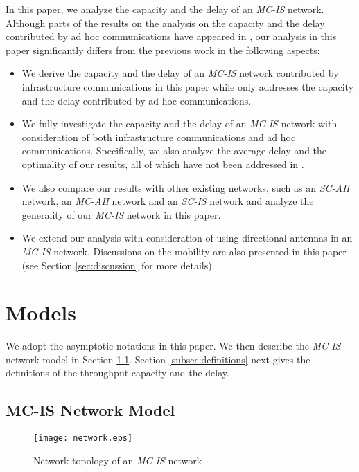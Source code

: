 \documentclass[10pt,journal]{IEEEtran}
\begin{document}
In this paper, we analyze the capacity and the delay of an \textit{MC-IS} network. Although parts of the results on the analysis on the capacity and the delay contributed by ad hoc communications have appeared in \cite{hndai:MC-IS}, our analysis in this paper significantly differs from the previous work in the following aspects:
\begin{itemize}
\item We derive the capacity and the delay of an \textit{MC-IS} network contributed by infrastructure communications in this paper while \cite{hndai:MC-IS} only addresses the capacity and the delay contributed by ad hoc communications.
\item We fully investigate the capacity and the delay of an \textit{MC-IS} network with consideration of both infrastructure communications and ad hoc communications. Specifically, we also analyze the average delay and the optimality of our results, all of which have not been addressed in \cite{hndai:MC-IS}.
\item We also compare our results with other existing networks, such as an \textit{SC-AH} network, an \textit{MC-AH} network and an \textit{SC-IS} network and analyze the generality of our \textit{MC-IS} network in this paper.
\item We extend our analysis with consideration of using directional antennas in an \textit{MC-IS} network. Discussions on the mobility are also presented in this paper (see Section \ref{sec:discussion} for more details).
\end{itemize}


\section{Models}
\label{sec:models}

We adopt the asymptotic notations \cite{Cormen:2009} in this paper. We then describe the \textit{MC-IS} network model in Section \ref{subsec:MC-IS}. Section \ref{subsec:definitions} next gives the definitions of the throughput capacity and the delay. 




\subsection{MC-IS Network Model}
\label{subsec:MC-IS}

\begin{figure}[t]
\centering
\texttt{[image: network.eps]}
\caption{Network topology of an \textit{MC-IS} network}
\label{fig:network}
\end{figure}
\end{document}
